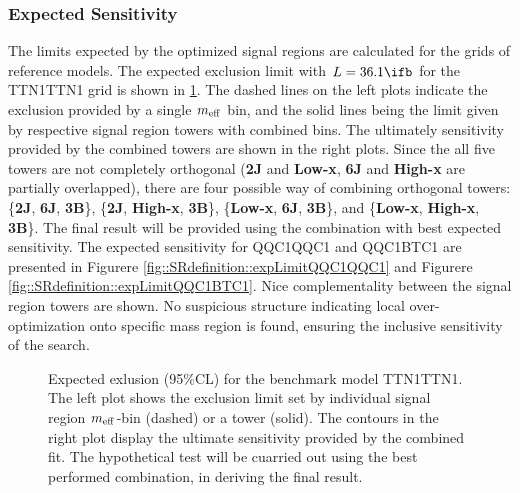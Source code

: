\subsubsection{Expected Sensitivity}
The limits expected by the optimized signal regions are calculated for the grids of reference models.
The expected exclusion limit with $L=36.1\ifb$ for the TTN1TTN1 \dire grid is shown in \ref{fig::SRdefinition::expLimitTTN1TTN1}. 
The dashed lines on the left plots indicate the exclusion provided by a single $m_{\mathrm{eff}}$ bin, and the solid lines being the limit given by respective signal region towers with combined bins. 
The ultimately sensitivity provided by the combined towers are shown in the right plots. 
Since the all five towers are not completely orthogonal (\textbf{2J} and \textbf{Low-x}, \textbf{6J} and \textbf{High-x} are partially overlapped), 
there are four possible way of combining orthogonal towers: \{\textbf{2J}, \textbf{6J}, \textbf{3B}\}, \{\textbf{2J}, \textbf{High-x}, \textbf{3B}\}, \{\textbf{Low-x}, \textbf{6J}, \textbf{3B}\}, and \{\textbf{Low-x}, \textbf{High-x}, \textbf{3B}\}.
The final result will be provided using the combination with best expected sensitivity. 
The expected sensitivity for QQC1QQC1 and QQC1BTC1 are presented in Figurere \ref{fig::SRdefinition::expLimitQQC1QQC1} and Figurere \ref{fig::SRdefinition::expLimitQQC1BTC1}. Nice complementality between the signal region towers are shown. No suspicious structure indicating local over-optimization onto specific mass region is found, ensuring the inclusive sensitivity of the search. 
\begin{figure}[h]
  \centering
    \caption{Expected exlusion (95$\%$CL) for the benchmark model TTN1TTN1. The left plot shows the exclusion limit set by individual signal region $m_{\mathrm{eff}}$-bin (dashed) or a tower (solid). The contours in the right plot display the ultimate sensitivity provided by the combined fit. The hypothetical test will be cuarried out using the best performed combination, in deriving the final result. }
    \label{fig::SRdefinition::expLimitTTN1TTN1}
\end{figure}


